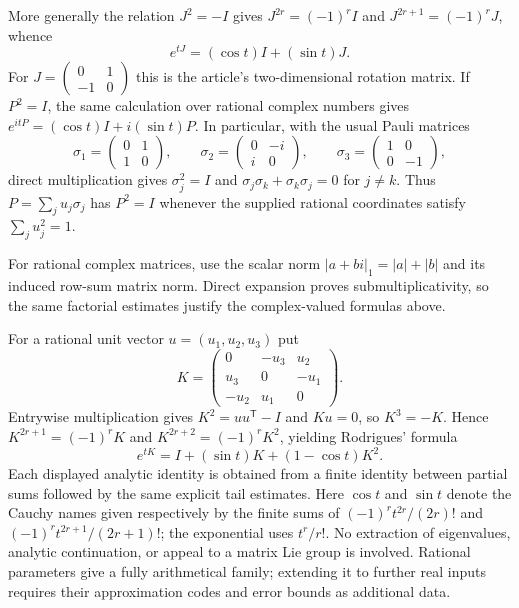 More generally the relation $J^2=-I$ gives
$J^{2r}=(-1)^rI$ and $J^{2r+1}=(-1)^rJ$, whence
\[
 e^{tJ}=(\cos t)I+(\sin t)J.
\]
For $J=\left(\begin{smallmatrix}0&1\\-1&0\end{smallmatrix}\right)$
this is the article's two-dimensional rotation matrix. If $P^2=I$,
the same calculation over rational complex numbers gives
$e^{itP}=(\cos t)I+i(\sin t)P$. In particular, with the usual Pauli
matrices
\[
 \sigma_1=\begin{pmatrix}0&1\\1&0\end{pmatrix},\qquad
 \sigma_2=\begin{pmatrix}0&-i\\i&0\end{pmatrix},\qquad
 \sigma_3=\begin{pmatrix}1&0\\0&-1\end{pmatrix},
\]
direct multiplication gives
$\sigma_j^2=I$ and
$\sigma_j\sigma_k+\sigma_k\sigma_j=0$ for $j\ne k$.
Thus $P=\sum_j u_j\sigma_j$ has $P^2=I$ whenever the supplied rational
coordinates satisfy $\sum_j u_j^2=1$.

For rational complex matrices, use the scalar norm
$|a+bi|_1=|a|+|b|$ and its induced row-sum matrix norm. Direct expansion
proves submultiplicativity, so the same factorial estimates justify
the complex-valued formulas above.

For a rational unit vector $u=(u_1,u_2,u_3)$ put
\[
 K=\begin{pmatrix}0&-u_3&u_2\\u_3&0&-u_1\\-u_2&u_1&0\end{pmatrix}.
\]
Entrywise multiplication gives $K^2=uu^{\mathsf T}-I$ and $Ku=0$,
so $K^3=-K$. Hence $K^{2r+1}=(-1)^rK$ and
$K^{2r+2}=(-1)^rK^2$, yielding Rodrigues' formula
\[
 e^{tK}=I+(\sin t)K+(1-\cos t)K^2.
\]
Each displayed analytic identity is obtained from a finite identity
between partial sums followed by the same explicit tail estimates.
Here $\cos t$ and $\sin t$ denote the Cauchy names given respectively by
the finite sums of $(-1)^rt^{2r}/(2r)!$ and
$(-1)^rt^{2r+1}/(2r+1)!$; the exponential uses $t^r/r!$.
No extraction of eigenvalues, analytic continuation, or appeal to a
matrix Lie group is involved. Rational parameters give a fully
arithmetical family; extending it to further real inputs requires
their approximation codes and error bounds as additional data.

